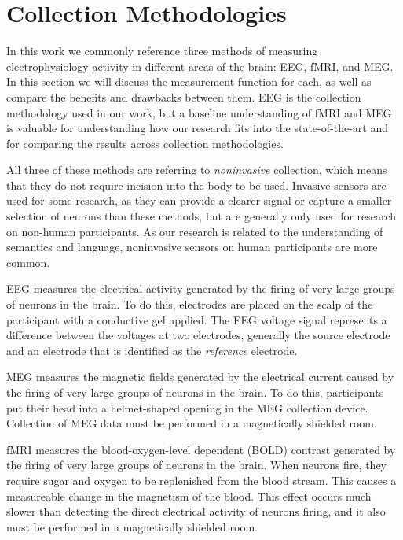 \section{Collection Methodologies}
\label{chapter:introduction:sec:collection}

In this work we commonly reference three methods of measuring electrophysiology 
activity in different areas of the brain: EEG, fMRI, and MEG. In this section 
we will discuss the measurement function for each, as well as compare the 
benefits and drawbacks between them. EEG is the collection methodology used in 
our work, but a baseline understanding of fMRI and MEG is valuable for 
understanding how our research fits into the state-of-the-art and for comparing 
the results across collection methodologies.

All three of these methods are referring to \emph{noninvasive} collection, 
which means that they do not require incision into the body to be used.  
Invasive sensors are used for some research, as they can provide a clearer 
signal or capture a smaller selection of neurons than these methods, but are 
generally only used for research on non-human participants. As our research is 
related to the understanding of semantics and language, noninvasive sensors on 
human participants are more common.

EEG measures the electrical activity generated by the firing of very large 
groups of neurons in the brain. To do this, electrodes are placed on the scalp 
of the participant with a conductive gel applied. The EEG voltage signal 
represents a difference between the voltages at two electrodes, generally the 
source electrode and an electrode that is identified as the \emph{reference} 
electrode.

MEG measures the magnetic fields generated by the electrical current caused by 
the firing of very large groups of neurons in the brain. To do this, 
participants put their head into a helmet-shaped opening in the MEG collection 
device.  Collection of MEG data must be performed in a magnetically shielded 
room.

fMRI measures the blood-oxygen-level dependent (BOLD) contrast generated by the 
firing of very large groups of neurons in the brain. When neurons fire, they 
require sugar and oxygen to be replenished from the blood stream. This causes a 
measureable change in the magnetism of the blood. This effect occurs much 
slower than detecting the direct electrical activity of neurons firing, and it 
also must be performed in a magnetically shielded room.

